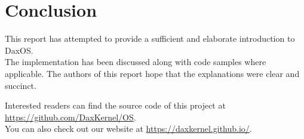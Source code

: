 
\chapter{Conclusion}\label{chapter:Conclusion}
\begin{flushleft}
	This report has attempted to provide a sufficient and elaborate introduction to DaxOS.\\
	The implementation has been discussed along with code samples where applicable.		
	The authors of this report hope that the explanations were clear and succinct.
	\vspace{1.5 cm}

	Interested readers can find the source code of this project at \url{https://github.com/DaxKernel/OS}.\\
	You can also check out our website at \url{https://daxkernel.github.io/}.
\end{flushleft}
